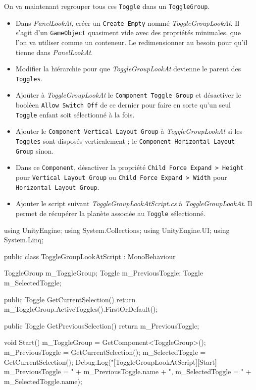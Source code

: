\documentclass[a4paper,10pt]{article}
\newenvironment{solution}%
{\begin{tcolorbox}[breakable,colback=red!5!white,colframe=red!75!black,title=Solution]}%
{\end{tcolorbox}}
\newenvironment{boxcode}%
{\begin{tcolorbox}[breakable,colback=gray!5!white,colframe=black]}%
	{\end{tcolorbox}}
\begin{document}
\begin{solution}
On va maintenant regrouper tous ces \texttt{Toggle} dans un \texttt{ToggleGroup}.
\begin{itemize}
	\item Dans \textit{PanelLookAt}, créer un \texttt{Create Empty} nommé \textit{ToggleGroupLookAt}. Il s'agit d'un \texttt{GameObject} quasiment vide avec des propriétés minimales, que l'on va utiliser comme un conteneur. Le redimensionner au besoin pour qu'il tienne dans  \textit{PanelLookAt}.
	\item Modifier la hiérarchie pour que \textit{ToggleGroupLookAt} devienne le parent des \texttt{Toggles}.
	\item Ajouter à \textit{ToggleGroupLookAt} le \texttt{Component Toggle Group} et désactiver le booléen \texttt{Allow Switch Off} de ce dernier pour faire en sorte qu'un seul \texttt{Toggle} enfant soit sélectionné à la fois.
	\item Ajouter le \texttt{Component Vertical Layout Group} à \textit{ToggleGroupLookAt} si les \texttt{Toggles} sont disposés verticalement ; le \texttt{Component Horizontal Layout Group} sinon.
	\item Dans ce \texttt{Component}, désactiver la propriété \texttt{Child Force Expand > Height} pour \texttt{Vertical Layout Group} ou \texttt{Child Force Expand > Width} pour \texttt{Horizontal Layout Group}.
	\item Ajouter le script suivant \textit{ToggleGroupLookAtScript.cs} à \textit{ToggleGroupLookAt}. Il permet de récupérer la planète associée au \texttt{Toggle} sélectionné.
\end{itemize}

\begin{boxcode}
	\begin{csharpsansbord}
using UnityEngine;
using System.Collections;
using UnityEngine.UI;
using System.Linq;

public class ToggleGroupLookAtScript : MonoBehaviour {
  ToggleGroup m_ToggleGroup;
  Toggle m_PreviousToggle;
  Toggle m_SelectedToggle;
	
  public Toggle GetCurrentSelection() {
  	return m_ToggleGroup.ActiveToggles().FirstOrDefault();
  }
	
  public Toggle GetPreviousSelection() {
	return m_PreviousToggle;
  }
	
  void Start() {
	m_ToggleGroup = GetComponent<ToggleGroup>();
	m_PreviousToggle = GetCurrentSelection();
	m_SelectedToggle = GetCurrentSelection();
	Debug.Log("[ToggleGroupLookAtScript][Start] m_PreviousToggle = " +
	m_PreviousToggle.name + ", m_SelectedToggle = " +
	m_SelectedToggle.name);
  }
	
}
\end{csharpsansbord}
\end{boxcode}
\end{solution}
\end{document}
